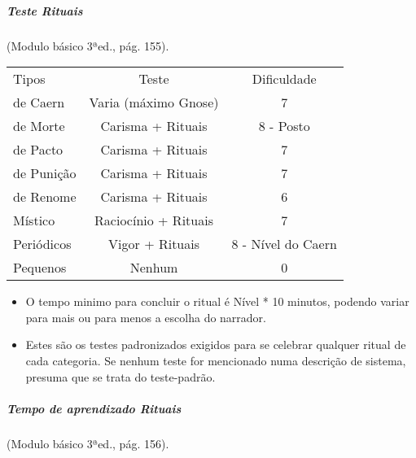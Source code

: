 \subparagraph{\bf Teste Rituais}(Modulo básico 3ªed., pág. 155).

\begin{table}[!htpb]
\centering
\label{Rituais}
\begin{tabular}{|l c c|}
\hline
Tipos           &	Teste					& Dificuldade			\\
\rowcolor[HTML]{EFEFEF} 
de Caern		& 	Varia (máximo Gnose)	& 7						\\
de Morte		& 	Carisma + Rituais		& 8 - Posto				\\
\rowcolor[HTML]{EFEFEF} 
de Pacto		&	Carisma + Rituais		& 7						\\
de Punição		&	Carisma + Rituais		& 7						\\
\rowcolor[HTML]{EFEFEF} 
de Renome		&	Carisma + Rituais		& 6						\\
Místico			&	Raciocínio + Rituais	& 7						\\
\rowcolor[HTML]{EFEFEF} 
Periódicos		&	Vigor + Rituais			& 8 - Nível do Caern	\\
Pequenos		&	Nenhum					& 0						\\
\hline
\end{tabular}
\end{table}

\begin{itemize}[noitemsep]
\item O tempo minimo para concluir o ritual é Nível * 10 minutos, podendo variar para mais ou para menos a escolha do narrador.

\item Estes são os testes padronizados exigidos para se celebrar qualquer ritual de cada categoria. Se nenhum teste for mencionado numa descrição de sistema, presuma que se trata do teste-padrão.
\end{itemize}

\subparagraph{\bf Tempo de aprendizado Rituais}(Modulo básico 3ªed., pág. 156).


